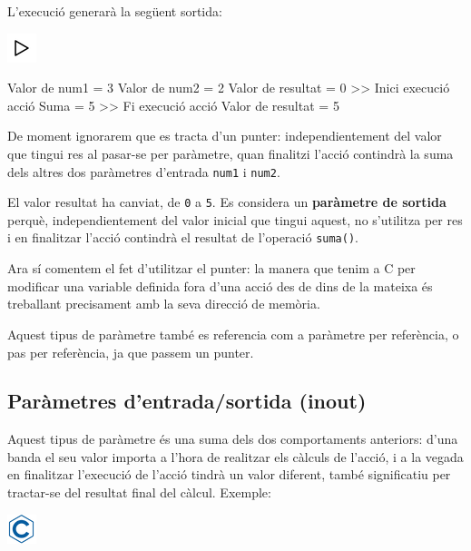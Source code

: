 \documentclass[]{book}
\newenvironment{Shaded}{\begin{snugshade}}{\end{snugshade}}
\newcommand{\DecValTok}[1]{\textcolor[rgb]{0.00,0.00,0.81}{#1}}
\newcommand{\NormalTok}[1]{#1}
\begin{document}
L'execució generarà la següent sortida:

\includegraphics{./img/play.png}

\begin{Shaded}
\begin{Highlighting}[]
\NormalTok{Valor de num1 = }\DecValTok{3}
\NormalTok{Valor de num2 = }\DecValTok{2}
\NormalTok{Valor de resultat = }\DecValTok{0}
\NormalTok{>> Inici execució acció}
\NormalTok{Suma = }\DecValTok{5}
\NormalTok{>> Fi execució acció}
\NormalTok{Valor de resultat = }\DecValTok{5}
\end{Highlighting}
\end{Shaded}

De moment ignorarem que es tracta d'un punter: independientement del
valor que tingui res al pasar-se per paràmetre, quan finalitzi l'acció
contindrà la suma dels altres dos paràmetres d'entrada \texttt{num1} i
\texttt{num2}.

El valor resultat ha canviat, de \texttt{0} a \texttt{5}. Es considera
un \textbf{paràmetre de sortida} perquè, independientement del valor
inicial que tingui aquest, no s'utilitza per res i en finalitzar l'acció
contindrà el resultat de l'operació \texttt{suma()}.

Ara sí comentem el fet d'utilitzar el punter: la manera que tenim a C
per modificar una variable definida fora d'una acció des de dins de la
mateixa és treballant precisament amb la seva direcció de memòria.

Aquest tipus de paràmetre també es referencia com a paràmetre per
referència, o pas per referència, ja que passem un punter.

\subsection{Paràmetres d'entrada/sortida
(inout)}\label{parametres-dentradasortida-inout}

Aquest tipus de paràmetre és una suma dels dos comportaments anteriors:
d'una banda el seu valor importa a l'hora de realitzar els càlculs de
l'acció, i a la vegada en finalitzar l'execució de l'acció tindrà un
valor diferent, també significatiu per tractar-se del resultat final del
càlcul. Exemple:

\includegraphics{./img/c.png}
\end{document}
